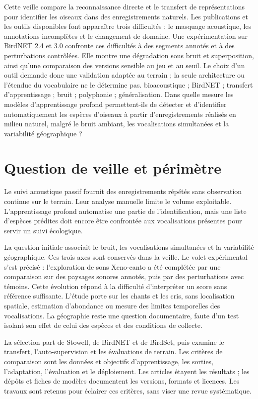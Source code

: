\documentclass{technology_watch}
\begin{document}
\raggedbottom

\MakeVeilleTitle
{Cette veille compare la reconnaissance directe et le transfert de
représentations pour identifier les oiseaux dans des enregistrements naturels.
Les publications et les outils disponibles font apparaître trois difficultés :
le masquage acoustique, les annotations incomplètes et le changement de domaine.
Une expérimentation sur BirdNET 2.4 et 3.0 confronte ces difficultés à des
segments annotés et à des perturbations contrôlées. Elle montre une dégradation
sous bruit et superposition, ainsi qu'une comparaison des versions sensible au
jeu et au seuil. Le choix d'un outil demande donc une validation adaptée au
terrain ; la seule architecture ou l'étendue du vocabulaire ne le détermine pas.}
{bioacoustique ; BirdNET ; transfert d'apprentissage ; bruit ; polyphonie ; généralisation.}
{Dans quelle mesure les modèles d'apprentissage profond permettent-ils de
détecter et d'identifier automatiquement les espèces d'oiseaux à partir
d'enregistrements réalisés en milieu naturel, malgré le bruit ambiant, les
vocalisations simultanées et la variabilité géographique ?}

\section{Question de veille et périmètre}

Le suivi acoustique passif fournit des enregistrements répétés sans observation
continue sur le terrain. Leur analyse manuelle limite le volume exploitable.
L'apprentissage profond automatise une partie de l'identification, mais une
liste d'espèces prédites doit encore être confrontée aux vocalisations présentes
pour servir un suivi écologique\cite{stowell2022,kahl2021}.

La question initiale associait le bruit, les vocalisations simultanées et la
variabilité géographique. Ces trois axes sont conservés dans la veille. Le
volet expérimental s'est précisé : l'exploration de sons Xeno-canto a été
complétée par une comparaison sur des paysages sonores annotés, puis par des
perturbations avec témoins. Cette évolution répond à la difficulté d'interpréter
un score sans référence suffisante. L'étude porte sur les chants et les cris,
sans localisation spatiale, estimation d'abondance ou mesure des limites
temporelles des vocalisations. La géographie reste une question documentaire,
faute d'un test isolant son effet de celui des espèces et des conditions de
collecte.

La sélection part de Stowell, de BirdNET et de BirdSet, puis examine le transfert,
l'auto-supervision et les évaluations de terrain. Les critères de comparaison
sont les données et objectifs d'apprentissage, les sorties, l'adaptation,
l'évaluation et le déploiement. Les articles étayent les résultats ; les dépôts
et fiches de modèles documentent les versions, formats et licences. Les travaux
sont retenus pour éclairer ces critères, sans viser une revue systématique.
\end{document}

